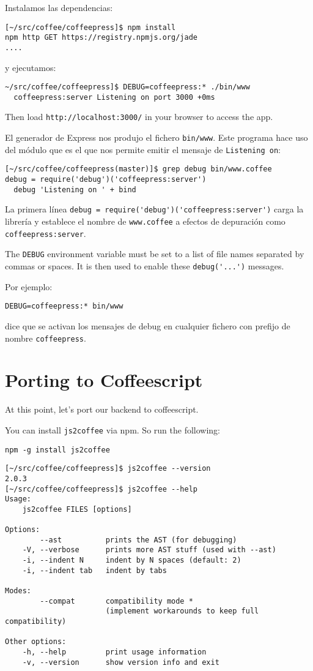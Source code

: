 
Instalamos las dependencias:
\begin{verbatim}
[~/src/coffee/coffeepress]$ npm install
npm http GET https://registry.npmjs.org/jade
....
\end{verbatim}
y ejecutamos:
\begin{verbatim}
~/src/coffee/coffeepress]$ DEBUG=coffeepress:* ./bin/www
  coffeepress:server Listening on port 3000 +0ms
\end{verbatim}
Then load \verb|http://localhost:3000/| in your browser to access the app.


El generador de Express nos produjo el fichero \verb|bin/www|.
Este programa hace uso del módulo 
que es el que nos permite emitir el mensaje de \verb|Listening on|:
\begin{verbatim}
[~/src/coffee/coffeepress(master)]$ grep debug bin/www.coffee 
debug = require('debug')('coffeepress:server')
  debug 'Listening on ' + bind
\end{verbatim}
La primera línea \verb|debug = require('debug')('coffeepress:server')| carga la librería
y establece el nombre de \verb|www.coffee| a efectos de depuración como
\verb'coffeepress:server'.

The \verb|DEBUG| environment variable must be set to a list of file names
separated by commas or spaces. It is then used to enable these 
\verb|debug('...')| messages. 

Por ejemplo:
\begin{verbatim}
DEBUG=coffeepress:* bin/www
\end{verbatim}
dice que se activan los mensajes de debug en cualquier fichero con 
prefijo de nombre \verb|coffeepress|.

\section{Porting to Coffeescript}
At this point, let’s port our backend to coffeescript. 

You can install \verb|js2coffee| via npm. So run the following:

\begin{verbatim}
npm -g install js2coffee
\end{verbatim}
\begin{verbatim}
[~/src/coffee/coffeepress]$ js2coffee --version
2.0.3
[~/src/coffee/coffeepress]$ js2coffee --help
Usage:
    js2coffee FILES [options]

Options:
        --ast          prints the AST (for debugging)
    -V, --verbose      prints more AST stuff (used with --ast)
    -i, --indent N     indent by N spaces (default: 2)
    -i, --indent tab   indent by tabs

Modes:
        --compat       compatibility mode *
                       (implement workarounds to keep full compatibility)

Other options:
    -h, --help         print usage information
    -v, --version      show version info and exit
\end{verbatim}

